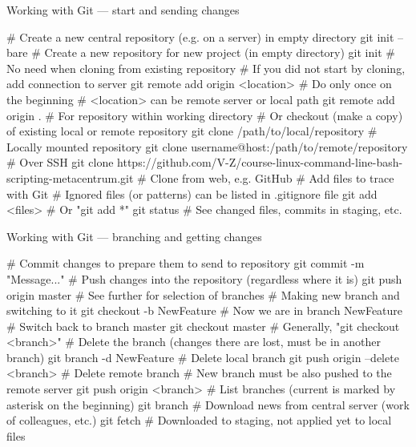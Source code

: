 \documentclass[compress, xelatex, 11pt, xcolor=svgnames, aspectratio=169,
	hyperref={
		bookmarks=true,
		unicode=true,
		colorlinks=true,
		pdftitle={Linux, command line and MetaCentrum},
		plainpages=false,
		pdfauthor={Vojtech Zeisek},
		pdfsubject={Course about use of Linux command line, writing shell scripts and using MetaCentrum of CESNET},
		pdfcreator={XeLaTeX},
		pdfkeywords={Linux, GNU, BASH, shell, command line, MetaCentrum},
		linkcolor=DarkRed, %
		anchorcolor=DarkBlue, %
		citecolor=Indigo, %
		filecolor=NavyBlue, %
		menucolor=DarkMagenta, %
		urlcolor=DarkBlue, %
		},
	url={hyphens, lowtilde} %
	]{beamer}
\begin{document}
\begin{frame}[fragile]{Working with Git --- start and sending changes}
	\begin{bashcode}
    # Create a new central repository (e.g. on a server) in empty directory
    git init --bare
    # Create a new repository for new project (in empty directory)
    git init # No need when cloning from existing repository
    # If you did not start by cloning, add connection to server
    git remote add origin <location> # Do only once on the beginning
    # <location> can be remote server or local path
    git remote add origin . # For repository within working directory
    # Or checkout (make a copy) of existing local or remote repository
    git clone /path/to/local/repository # Locally mounted repository
    git clone username@host:/path/to/remote/repository # Over SSH
    git clone https://github.com/V-Z/course-linux-command-line-bash-
      scripting-metacentrum.git # Clone from web, e.g. GitHub
    # Add files to trace with Git
    # Ignored files (or patterns) can be listed in .gitignore file
    git add <files> # Or "git add *"
    git status # See changed files, commits in staging, etc.
	\end{bashcode}
\end{frame}

\begin{frame}[fragile]{Working with Git --- branching and getting changes}
	\begin{bashcode}
    # Commit changes to prepare them to send to repository
    git commit -m "Message..."
    # Push changes into the repository (regardless where it is)
    git push origin master # See further for selection of branches
    # Making new branch and switching to it
    git checkout -b NewFeature # Now we are in branch NewFeature
    # Switch back to branch master
    git checkout master # Generally, "git checkout <branch>"
    # Delete the branch (changes there are lost, must be in another branch)
    git branch -d NewFeature # Delete local branch
    git push origin --delete <branch> # Delete remote branch
    # New branch must be also pushed to the remote server
    git push origin <branch>
    # List branches (current is marked by asterisk on the beginning)
    git branch
    # Download news from central server (work of colleagues, etc.)
    git fetch # Downloaded to staging, not applied yet to local files
	\end{bashcode}
\end{frame}
\end{document}
